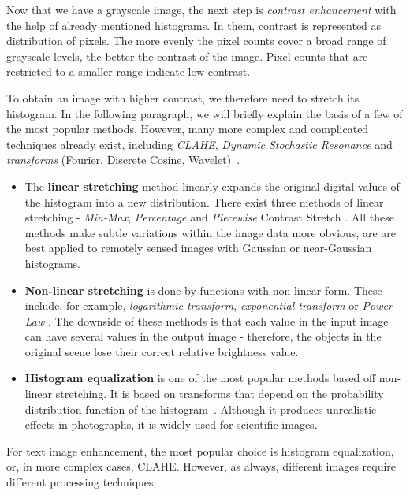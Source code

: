 Now that we have a grayscale image, the next step is \emph{contrast enhancement} with the help of already mentioned histograms. In them, contrast is represented as distribution of pixels. The more evenly the pixel counts cover a broad range of grayscale levels, the better the contrast of the image. Pixel counts that are restricted to a smaller range indicate low contrast.

To obtain an image with higher contrast, we therefore need to stretch its histogram. In the following paragraph, we will briefly explain the basis of a few of the most popular methods. However, many more complex and complicated techniques already exist, including \emph{CLAHE}, \emph{Dynamic Stochastic Resonance} and \emph{transforms} (Fourier, Discrete Cosine, Wavelet)~\cite{contrastOther}.

\begin{itemize}

\item The \textbf{linear stretching} method linearly expands the original digital values of the histogram into a new distribution. There exist three methods of linear stretching - \emph{Min-Max}, \emph{Percentage} and \emph{Piecewise} Contrast Stretch \citet{linearNonStretch}. All these methods make subtle variations within the image data more obvious, are are best applied to remotely sensed images with Gaussian or near-Gaussian histograms.

\item\textbf{Non-linear stretching} is done by functions with non-linear form. These include, for example, \emph{logarithmic transform}, \emph{exponential transform} or \emph{Power Law} \citep{linearNonStretch}. The downside of these methods is that each value in the input image can have several values in the output image - therefore, the objects in the original scene lose their correct relative brightness value.

\item\textbf{Histogram equalization} is one of the most popular methods based off non-linear stretching. It is based on transforms that depend on the probability distribution function of the histogram~\citep{histogramEQ}. Although it produces unrealistic effects in photographs, it is widely used for scientific images.

\end{itemize}

For text image enhancement, the most popular choice is histogram equalization, or, in more complex cases, CLAHE. However, as always, different images require different processing techniques.

